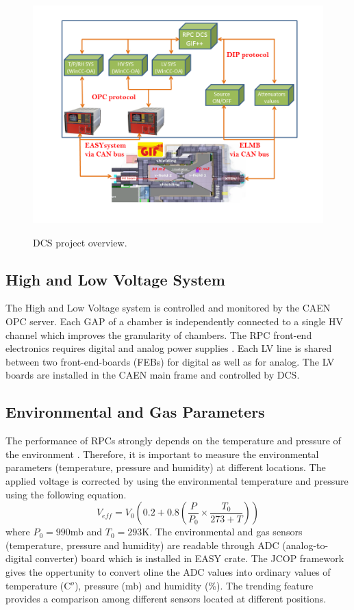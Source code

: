 \documentclass[a4paper,11pt]{article}
\begin{document}
\begin{figure}[htp]
\centering
\hspace{-0.5cm}
\includegraphics[scale=0.5,trim=60 30 60 30,clip]{images/DCS_sys.png}\\
 \caption{DCS project overview.}
\label{DCS_sys}
\end{figure}

 
\subsection{High and Low Voltage System}
The High and Low Voltage system is controlled and monitored by the CAEN OPC server. Each GAP of a chamber is independently connected to a single HV channel which improves the granularity of chambers. The RPC front-end electronics requires digital and analog power supplies \cite{feb}. Each LV line is shared between two front-end-boards (FEBs) for digital as well as for analog. The LV boards are installed in the CAEN main frame and controlled by DCS. 
 
\subsection{Environmental and Gas Parameters}
The performance of RPCs strongly depends on the temperature and pressure of the environment \cite{env-rpc}. Therefore, it is important to measure the environmental parameters (temperature, pressure and humidity) at different locations. The applied voltage is corrected by using the environmental temperature and pressure using the following equation.
\begin{equation*}\label{veff}
V_{eff} = V_{0} ( 0.2 + 0.8 (\frac{P}{P_{0}} \times \frac{T_{0}}{273+T}))
\end{equation*}
where $P_{0} = 990$mb and $T_{0} = 293$K.
The environmental and gas sensors (temperature, pressure and humidity) are readable through ADC (analog-to-digital converter) board which is installed in EASY crate. The JCOP framework gives the oppertunity to convert oline the ADC values into ordinary values of temperature (C$^o$), pressure (mb) and humidity (\%). The trending feature provides a comparison among different sensors located at different positions.
\end{document}
